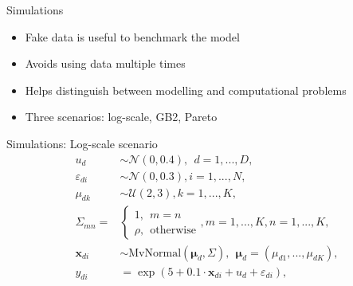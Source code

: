 \begin{frame}{Simulations}
    \begin{itemize}
        \item Fake data is useful to benchmark the model
        \item Avoids using data multiple times
        \item Helps distinguish between modelling and computational problems
        \item Three scenarios: log-scale, GB2, Pareto \cite{rojas_perilla_data_2020}
    \end{itemize}
\end{frame}

\begin{frame}{Simulations: Log-scale scenario}
        \vspace{-1cm}
\begin{equation}
    \begin{split}
        u_d & \sim \mathcal N(0, 0.4), ~~ d = 1,...,D,\\
        \varepsilon_{di} & \sim \mathcal{N}(0, 0.3), i = 1,...,N,\\
        \mu_{dk} & \sim \mathcal{U}(2, 3), k = 1,...,K,\\
        \Sigma_{mn} = &\begin{cases} 1, ~~ m = n \\ \rho,  ~~ \text{otherwise}  \end{cases},
        m = 1,...,K, n = 1,...,K,\\
        \boldsymbol x_{di}  &\sim \text{MvNormal} (\boldsymbol \mu_{d}, \Sigma) ,
        ~~ \boldsymbol \mu_{d} = (\mu_{d1}, ..., \mu_{dK}),\\
        y_{di} & = \exp(5 + 0.1 \cdot \boldsymbol x_{di}  + u_d + \varepsilon_{di}),\\
    \end{split}
    \label{eq:log_scenario}
\end{equation}

\end{frame}

